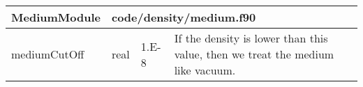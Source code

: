 \documentclass{article}
\begin{document}
{ }




\begin{longtable}{llll}
\toprule
\textbf{\large{MediumModule}} & \multicolumn{3}{l}{\footnotesize{code/density/medium.f90}}\\*
\midrule
\endfirsthead
\midrule
\endhead
mediumCutOff & \begin{minipage}[t]{2cm}real\end{minipage} & \begin{minipage}[t]{2cm}1.E-8\end{minipage} & \begin{minipage}[t]{12cm}If the density is lower than this value, then we treat the medium like vacuum.\end{minipage}\\*
\bottomrule
\end{longtable}
{ }



\end{document}
